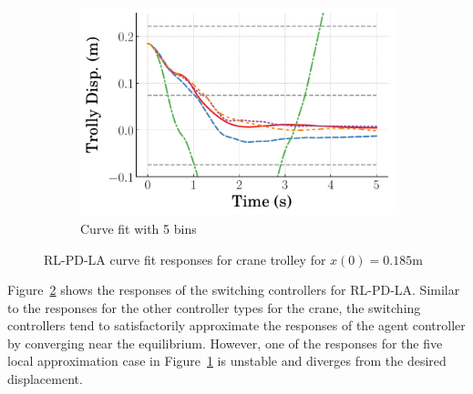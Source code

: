 \begin{figure}
\begin{subfigure}[b]{0.32\textwidth}
    \end{subfigure}
    \hfill
    \begin{subfigure}[b]{0.32\textwidth}
        \centering
        \includegraphics[width=\textwidth]{figures/figures_Interpretability/Mean_ISE_dpcrane_cubic_5_bins/curve_fit_time_responses/RL_PD_LA/curve_fit_0p18_Trolly_Disp.pdf} 
        \caption{Curve fit with 5 bins}
        \label{subfig_chap5:dpcrane_RL_PD_LA_trolley_0.185_init_curve_fit_5_bins_unclipped}
    \end{subfigure}
    \hfill
    \caption{RL-PD-LA curve fit responses for crane trolley for $x(0)=0.185\si{\meter}$}
    \label{fig_chap5:dpcrane_RL_PD_LA_trolley_0.185_init_unclipped}
\end{figure}
%
Figure~\ref{fig_chap5:dpcrane_RL_PD_LA_trolley_0.185_init_unclipped} shows the responses of the switching controllers for RL-PD-LA. Similar to the responses for the other controller types for the crane, the switching controllers tend to satisfactorily approximate the responses of the agent controller by converging near the equilibrium. However, one of the responses for the five local approximation case in Figure~\ref{subfig_chap5:dpcrane_RL_PD_LA_trolley_0.185_init_curve_fit_5_bins_unclipped} is unstable and diverges from the desired displacement.

